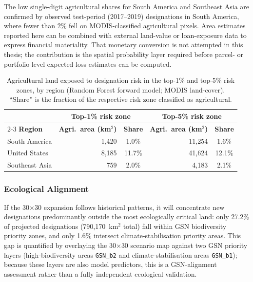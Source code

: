 \documentclass[12pt]{article}
\theoremstyle{break}
\begin{document}
The low single-digit agricultural shares for South America and Southeast Asia are
confirmed by observed test-period (2017--2019) designations in South America,
where fewer than 2\% fell on MODIS-classified agricultural pixels.
Area estimates reported here can be combined with external land-value or loan-exposure
data to express financial materiality. That monetary conversion is not attempted in
this thesis; the contribution is the spatial probability layer required before
parcel- or portfolio-level expected-loss estimates can be computed.

\begin{table}[H]
\centering
\caption{Agricultural land exposed to designation risk in the top-1\% and top-5\%
risk zones, by region (Random Forest forward model; MODIS land-cover). ``Share'' is the
fraction of the respective risk zone classified as agricultural.}
\label{tab:exposure}
\begin{tabular}{lrc@{\quad}rc}
\toprule
 & \multicolumn{2}{c}{\textbf{Top-1\% risk zone}} & \multicolumn{2}{c}{\textbf{Top-5\% risk zone}} \\
\cmidrule{2-3}\cmidrule{4-5}
\textbf{Region} & \textbf{Agri.\ area (km$^2$)} & \textbf{Share} & \textbf{Agri.\ area (km$^2$)} & \textbf{Share} \\
\midrule
South America  & 1{,}420  & 1.0\%  & 11{,}254 & 1.6\% \\
United States  & 8{,}185  & 11.7\% & 41{,}624 & 12.1\% \\
Southeast Asia & 759      & 2.0\%  & 4{,}183  & 2.1\% \\
\bottomrule
\end{tabular}
\end{table}

\subsubsection{Ecological Alignment}
\label{sec:forward_overlap}
If the 30$\times$30 expansion follows historical patterns, it will concentrate new
designations predominantly outside the most ecologically critical land:
only 27.2\% of projected designations (790,170~km$^2$ total) fall within
GSN biodiversity priority zones, and only 1.6\% intersect
climate-stabilisation priority areas. This gap is quantified by overlaying the
30$\times$30 scenario map against two GSN priority layers (high-biodiversity areas
\texttt{GSN\_b2} and climate-stabilisation areas \texttt{GSN\_b1}); because these
layers are also model predictors, this is a GSN-alignment assessment rather than a
fully independent ecological validation.
\end{document}
